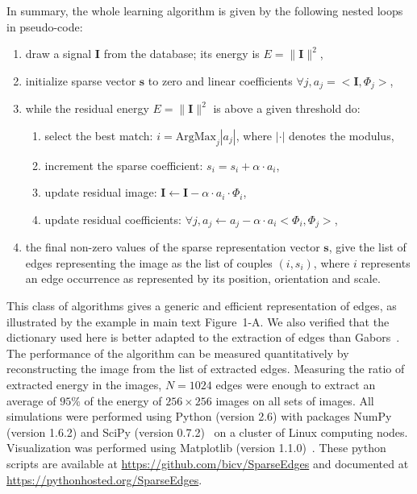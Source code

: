 \documentclass[a4paper]{article}
\newcounter{num}
\begin{document}
In summary, the whole learning algorithm is given by the following nested loops
in pseudo-code: 
\begin{enumerate}
\item draw a signal $\mathbf{I}$ from the database; its energy is $E = \| \mathbf{I} \|^2$,
\item initialize sparse vector $\mathbf{s}$ to zero and linear coefficients $\forall j, {a}_j=<\mathbf{I}, \Phi_j >$,
\item while the residual energy $E = \| \mathbf{I} \|^2$ is above a given threshold do:
\begin{enumerate}
\item select the best match: $i = \mbox{ArgMax}_{j} | {a}_j |$, where $| \cdot |$ denotes the modulus, 
\item increment the sparse coefficient: $s_{i} = s_{i} + \alpha \cdot {a}_{i}$,
\item update residual image: $ \mathbf{I} \leftarrow \mathbf{I} - \alpha \cdot a_{i} \cdot \Phi_{i} $,
\item update residual coefficients: $\forall j, {a}_j \leftarrow {a}_j - \alpha \cdot a_{i} <\Phi_{i} , \Phi_j > $,
\end{enumerate}
\item the final non-zero values of the sparse representation vector
$\mathbf{s}$, give the list of edges representing the
image as the list of couples $(i, s_{i})$, where $i$ represents an edge occurrence 
as represented by its position, orientation and scale.  
\end{enumerate}
This class of algorithms gives a generic and efficient representation of edges,
as illustrated by the example in main text Figure~1-A. %
We also verified that the dictionary used here is better adapted 
to the extraction of edges than Gabors~\autocite{Fischer07}. 
The performance of the algorithm can be measured quantitatively 
by reconstructing the image from the list of extracted edges.
Measuring the ratio of extracted energy in the images, $N=1024$ edges were
enough to extract an average of $95\%$ of the energy of $256\times 256$
images on all sets of images. %
All simulations were performed using Python (version 2.6) 
with packages NumPy (version 1.6.2) and SciPy (version 0.7.2)~\autocite{Oliphant07} 
on a cluster of Linux computing nodes. 
Visualization was performed using Matplotlib (version 1.1.0)~\autocite{Hunter07}. 
These python scripts are available at \url{https://github.com/bicv/SparseEdges} and 
documented at \url{https://pythonhosted.org/SparseEdges}.
\end{document}

